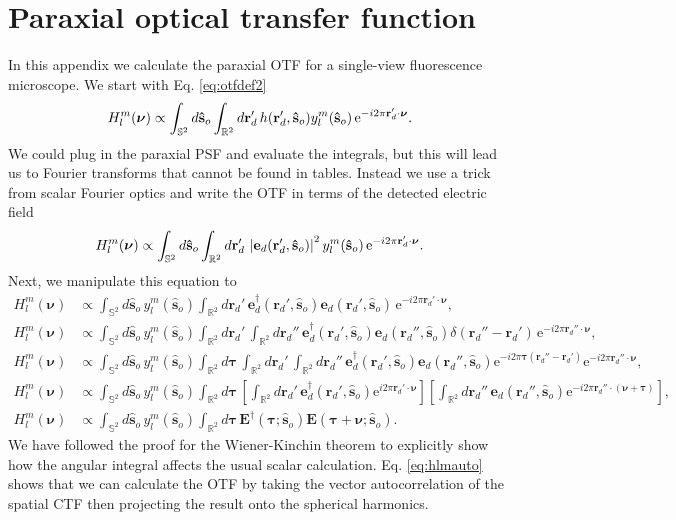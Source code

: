 \documentclass[11pt]{article}
\newcommand{\me}{\mathrm{e}}
\providecommand{\mb}[1]{\mathbf{#1}}
\providecommand{\so}[1]{\mathbf{\hat{s}}_o}
\providecommand{\rd}[1]{\mathbf{r}_d}
\providecommand{\bs}[1]{\boldsymbol{#1}}
\begin{document}
\section{Paraxial optical transfer function}\label{paraxialotf}
In this appendix we calculate the paraxial OTF for a single-view fluorescence
microscope. We start with Eq. \ref{eq:otfdef2}
\begin{align}
  H_l^m(\bs{\nu}) \propto \int_{\mathbb{S}^2}d\so{}\int_{\mathbb{R}^2}d\rd{}'\, h(\rd{}', \so{}) y_l^m(\so{})\thinspace\me^{-i 2\pi \rd{}'\cdot\bs{\nu}}.\label{eq:otfdef2}
\end{align}
We could plug in the paraxial PSF and evaluate the integrals, but this will lead
us to Fourier transforms that cannot be found in tables. Instead we use a trick
from scalar Fourier optics and write the OTF in terms of the detected electric
field \cite{goodman1996}
\begin{align}
  H_l^m(\bs{\nu}) \propto \int_{\mathbb{S}^2}d\so{}\int_{\mathbb{R}^2}d\rd{}'\, \left|\mb{e}_d(\rd{}', \so{})\right|^2 y_l^m(\so{})\thinspace\me^{-i 2\pi \rd{}'\cdot\bs{\nu}}.
\end{align}
Next, we manipulate this equation to
\begin{align}
  H_l^m(\bs{\nu}) &\propto \int_{\mathbb{S}^2}d\so{}\, y_l^m(\so{})\int_{\mathbb{R}^2}d\rd{}'\, \mb{e}^{\dagger}_d(\rd{}', \so{})\mb{e}_d(\rd{}', \so{})\, \me^{-i 2\pi \rd{}'\cdot\bs{\nu}},\\
  H_l^m(\bs{\nu}) &\propto \int_{\mathbb{S}^2}d\so{}\, y_l^m(\so{})\int_{\mathbb{R}^2}d\rd{}'\, \int_{\mathbb{R}^2}d\rd{}''\, \mb{e}^{\dagger}_d(\rd{}', \so{})\mb{e}_d(\rd{}'', \so{})\delta(\rd{}'' - \rd{}')\, \me^{-i 2\pi \rd{}''\cdot\bs{\nu}},\\
  H_l^m(\bs{\nu}) &\propto \int_{\mathbb{S}^2}d\so{}\, y_l^m(\so{})\int_{\mathbb{R}^2}d\bs{\tau}\,\int_{\mathbb{R}^2}d\rd{}'\, \int_{\mathbb{R}^2}d\rd{}''\, \mb{e}^{\dagger}_d(\rd{}', \so{})\mb{e}_d(\rd{}'', \so{})\me^{-i 2\pi\bs{\tau}(\rd{}'' - \rd{}')}\me^{-i 2\pi \rd{}''\cdot\bs{\nu}},\\
  H_l^m(\bs{\nu}) &\propto \int_{\mathbb{S}^2}d\so{}\, y_l^m(\so{})\int_{\mathbb{R}^2}d\bs{\tau}\,\left[\int_{\mathbb{R}^2}d\rd{}'\, \mb{e}^{\dagger}_d(\rd{}', \so{}) \me^{i 2\pi\rd{}'\cdot \bs{\nu}}\right]\left[\int_{\mathbb{R}^2}d\rd{}''\, \mb{e}_d(\rd{}'', \so{})\me^{-i 2\pi \rd{}''\cdot(\bs{\nu} + \bs{\tau})}\right],\\
  H_l^m(\bs{\nu}) &\propto \int_{\mathbb{S}^2}d\so{}\, y_l^m(\so{})\int_{\mathbb{R}^2}d\bs{\tau}\,\mb{E}^{\dagger}(\bs{\tau}; \so{})\mb{E}(\bs{\tau} + \bs{\nu}; \so{}). \label{eq:hlmauto}
\end{align}
We have followed the proof for the Wiener-Kinchin theorem \cite{papoulis2002, wiener} to explicitly show how the angular integral affects the usual scalar
calculation. Eq. \ref{eq:hlmauto} shows that we can calculate the OTF by taking
the vector autocorrelation of the spatial CTF then projecting the result onto
the spherical harmonics.
\end{document}
